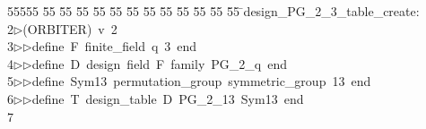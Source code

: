%
%
\begin{tabbing}
55555 \= 55 \= 55 \= 55 \= 55 \= 55 \= 55 \= 55 \= 55 \= 55 \= 55 \= 55 \= 55 \= \>design\_PG\_2\_3\_table\_create:\\[0pt]
2\>$\triangleright$\>(ORBITER)\ v\ 2\ \\[0pt]
3\>$\triangleright$\>$\triangleright$\>define\ F\ finite\_field\ q\ 3\ end\ \\[0pt]
4\>$\triangleright$\>$\triangleright$\>define\ D\ design\ field\ F\ family\ PG\_2\_q\ end\ \\[0pt]
5\>$\triangleright$\>$\triangleright$\>define\ Sym13\ permutation\_group\ symmetric\_group\ 13\ end\ \\[0pt]
6\>$\triangleright$\>$\triangleright$\>define\ T\ design\_table\ D\ PG\_2\_13\ Sym13\ end\\[0pt]
7\>\end{tabbing}
